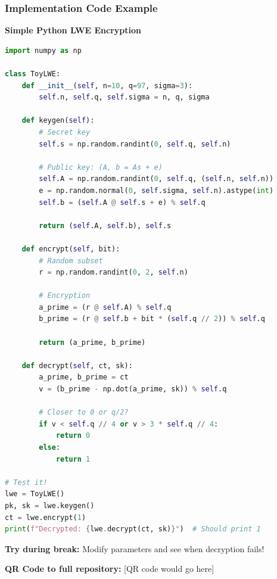 \documentclass[aspectratio=169,10pt]{beamer}
\newcommand{\teaching}[1]{}
\newcommand{\slideheader}[1]{\frametitle{#1}}
\theoremstyle{plain}
\begin{document}
\begin{frame}[fragile]
  \slideheader{Implementation Code Example}
  
  \begin{center}
    \textbf{\large Simple Python LWE Encryption}
  \end{center}
  
  \vspace{0.3cm}
  
  \begin{lstlisting}[language=Python, basicstyle=\tiny]
import numpy as np

class ToyLWE:
    def __init__(self, n=10, q=97, sigma=3):
        self.n, self.q, self.sigma = n, q, sigma
        
    def keygen(self):
        # Secret key
        self.s = np.random.randint(0, self.q, self.n)
        
        # Public key: (A, b = As + e)
        self.A = np.random.randint(0, self.q, (self.n, self.n))
        e = np.random.normal(0, self.sigma, self.n).astype(int)
        self.b = (self.A @ self.s + e) % self.q
        
        return (self.A, self.b), self.s
    
    def encrypt(self, bit):
        # Random subset
        r = np.random.randint(0, 2, self.n)
        
        # Encryption
        a_prime = (r @ self.A) % self.q
        b_prime = (r @ self.b + bit * (self.q // 2)) % self.q
        
        return (a_prime, b_prime)
    
    def decrypt(self, ct, sk):
        a_prime, b_prime = ct
        v = (b_prime - np.dot(a_prime, sk)) % self.q
        
        # Closer to 0 or q/2?
        if v < self.q // 4 or v > 3 * self.q // 4:
            return 0
        else:
            return 1

# Test it!
lwe = ToyLWE()
pk, sk = lwe.keygen()
ct = lwe.encrypt(1)
print(f"Decrypted: {lwe.decrypt(ct, sk)}")  # Should print 1
  \end{lstlisting}
  
  \vspace{0.3cm}
  
  \begin{blueBox}
    \textbf{Try during break:} Modify parameters and see when decryption fails!
  \end{blueBox}
  
  \begin{greenBox}
    \textbf{QR Code to full repository:} [QR code would go here]
  \end{greenBox}
  
  \teaching{Hands-on learning opportunity}
\end{frame}
\end{document}
